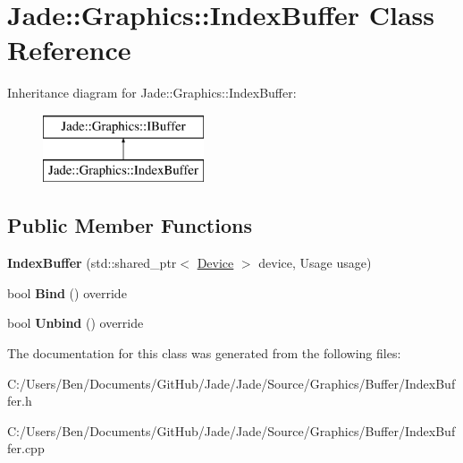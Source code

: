 \hypertarget{class_jade_1_1_graphics_1_1_index_buffer}{}\section{Jade\+:\+:Graphics\+:\+:Index\+Buffer Class Reference}
\label{class_jade_1_1_graphics_1_1_index_buffer}
Inheritance diagram for Jade\+:\+:Graphics\+:\+:Index\+Buffer\+:\begin{figure}[H]
\begin{center}
\leavevmode
\includegraphics[height=2.000000cm]{class_jade_1_1_graphics_1_1_index_buffer}
\end{center}
\end{figure}
\subsection*{Public Member Functions}
\begin{DoxyCompactItemize}
\item 
\hypertarget{class_jade_1_1_graphics_1_1_index_buffer_a7157d0e6e3ca5a0f43c44a71dd05c0f3}{}{\bfseries Index\+Buffer} (std\+::shared\+\_\+ptr$<$ \hyperlink{class_jade_1_1_graphics_1_1_device}{Device} $>$ device, Usage usage)\label{class_jade_1_1_graphics_1_1_index_buffer_a7157d0e6e3ca5a0f43c44a71dd05c0f3}

\item 
\hypertarget{class_jade_1_1_graphics_1_1_index_buffer_a9dd065bfaeeba74a03e74c566dadecec}{}bool {\bfseries Bind} () override\label{class_jade_1_1_graphics_1_1_index_buffer_a9dd065bfaeeba74a03e74c566dadecec}

\item 
\hypertarget{class_jade_1_1_graphics_1_1_index_buffer_a792d7499c8200f45bd2d92ea16c47a5d}{}bool {\bfseries Unbind} () override\label{class_jade_1_1_graphics_1_1_index_buffer_a792d7499c8200f45bd2d92ea16c47a5d}

\end{DoxyCompactItemize}


The documentation for this class was generated from the following files\+:\begin{DoxyCompactItemize}
\item 
C\+:/\+Users/\+Ben/\+Documents/\+Git\+Hub/\+Jade/\+Jade/\+Source/\+Graphics/\+Buffer/Index\+Buffer.\+h\item 
C\+:/\+Users/\+Ben/\+Documents/\+Git\+Hub/\+Jade/\+Jade/\+Source/\+Graphics/\+Buffer/Index\+Buffer.\+cpp\end{DoxyCompactItemize}

